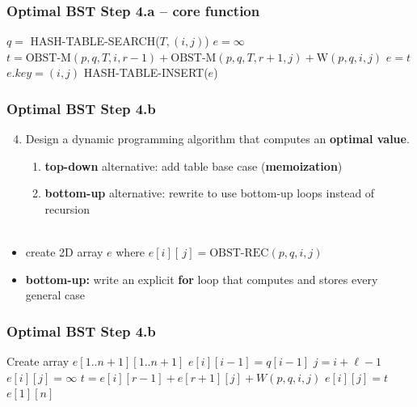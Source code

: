 \documentclass{beamer}
\newcommand{\stanza}{ \\~\ }
\begin{document}
\begin{frame} \frametitle{Optimal BST Step 4.a -- core function}
  {\scriptsize
  \begin{algorithmic}[1]
    \State $q = $ HASH-TABLE-SEARCH($T, (i, j)$)
      \State {}
    \EndIf
      \State {}
    \EndIf
    \State $e = \infty$
      \State $t = \text{OBST-M}(p, q, T, i, r-1) + \text{OBST-M}(p, q, T, r+1, j) + \text{W}(p, q, i, j)$
        \State $e = t$
      \EndIf
    \EndFor
    \State $e.key = (i, j)$
    \State HASH-TABLE-INSERT($e$)
    \State {}
    \EndFunction
  \end{algorithmic}
  }
\end{frame}

\begin{frame} \frametitle{Optimal BST Step 4.b}
  \begin{enumerate}
    \setcounter{enumi}{3}
    \item Design a dynamic programming algorithm that computes an \textbf{optimal value}.
    \begin{enumerate}
      \item \textbf{top-down} alternative: add table base case (\textbf{memoization})
      \item \textbf{bottom-up} alternative: rewrite to use bottom-up loops instead of recursion
      \stanza
    \end{enumerate}
  \end{enumerate}
  \begin{itemize}
    \item create 2D array $e$ where $e[i][\, j] = \text{OBST-REC}(p, q, i, j)$
    \item \textbf{bottom-up:} write an explicit \textbf{for} loop that computes and stores every general case
  \end{itemize}
  \end{frame}
    
  \begin{frame} \frametitle{Optimal BST Step 4.b}
    {\footnotesize
    \begin{algorithmic}[1]
      \State Create array $e[1..n+1][1..n+1]$ 
        \State $e[i][i-1] = q[i-1]$ 
      \EndFor
          \State $j = i + \ell - 1$
          \State $e[i][j] = \infty$
            \State $t = e[i][r-1] + e[r+1][j] + W(p, q, i, j)$
              \State $e[i][j] = t$
            \EndIf
          \EndFor
        \EndFor
      \EndFor
      \State \Return $e[1][n]$
      \EndFunction
    \end{algorithmic}
    }
\end{frame}
  
\end{document}
